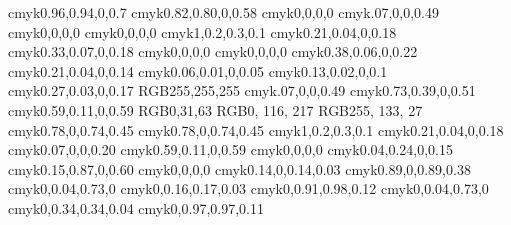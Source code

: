 \definecolor{firstpagetop@bg@color}		{cmyk}{0.96,0.94,0,0.7}
\definecolor{firstpagebottom@bg@color}	{cmyk}{0.82,0.80,0,0.58}
\definecolor{titledoc@color}				{cmyk}{0,0,0,0}
\definecolor{firstpage@lines@color}		{cmyk}{.07,0,0,0.49}
\definecolor{titleauthor@color}			{cmyk}{0,0,0,0}
\definecolor{titledate@color}			{cmyk}{0,0,0,0}
\definecolor{chapter@bg@color}			{cmyk}{1,0.2,0.3,0.1}
\definecolor{chapterdegrade@color}		{cmyk}{0.21,0.04,0,0.18}
\definecolor{chapterellipse@bg@color}	{cmyk}{0.33,0.07,0,0.18}
\definecolor{chapterellipse@color}		{cmyk}{0,0,0,0}
\definecolor{chaptertitlename@color}		{cmyk}{0,0,0,0}
\definecolor{chapterrule@color}			{cmyk}{0.38,0.06,0,0.22}
\definecolor{chaptermidcircle@color}		{cmyk}{0.21,0.04,0,0.14}
\definecolor{chapterbotcircle@color}		{cmyk}{0.06,0.01,0,0.05}
\definecolor{chaptertopcircle@color}		{cmyk}{0.13,0.02,0,0.1}
\definecolor{chapterline@color}			{cmyk}{0.27,0.03,0,0.17}
\definecolor{pagenumber@bg@color}		{RGB}{255,255,255}
\definecolor{shadow@color}				{cmyk}{.07,0,0,0.49}
\definecolor{chapterintro@color}			{cmyk}{0.73,0.39,0,0.51}
\definecolor{chapter@title@color}		{cmyk}{0.59,0.11,0,0.59}
\definecolor{section@title@color}		{RGB}{0,31,63}
\definecolor{subsection@title@color}		{RGB}{0, 116, 217}
\definecolor{subsubsection@title@color}	{RGB}{255, 133, 27}
\definecolor{paragraph@title@color}		{cmyk}{0.78,0,0.74,0.45}
\definecolor{subparagraph@title@color}	{cmyk}{0.78,0,0.74,0.45}
\definecolor{arrayrule@color}			{cmyk}{1,0.2,0.3,0.1}
\definecolor{cell@color}					{cmyk}{0.21,0.04,0,0.18}
\definecolor{rem@bg@color}				{cmyk}{0.07,0,0,0.20}
\definecolor{remtitle@bg@color}			{cmyk}{0.59,0.11,0,0.59}
\definecolor{remtitle@color}				{cmyk}{0,0,0,0}
\definecolor{meth@bg@color}				{cmyk}{0.04,0.24,0,0.15}
\definecolor{methtitle@bg@color}			{cmyk}{0.15,0.87,0,0.60}
\definecolor{methtitle@color}			{cmyk}{0,0,0,0}
\definecolor{def@bg@color}				{cmyk}{0.14,0,0.14,0.03}
\definecolor{deftitle@bg@color}			{cmyk}{0.89,0,0.89,0.38}
\definecolor{deftitle@color}				{cmyk}{0,0.04,0.73,0}
\definecolor{prop@bg@color}				{cmyk}{0,0.16,0.17,0.03}
\definecolor{proptitle@bg@color}			{cmyk}{0,0.91,0.98,0.12}
\definecolor{proptitle@color}			{cmyk}{0,0.04,0.73,0}
\definecolor{thm@bg@color}				{cmyk}{0,0.34,0.34,0.04}
\definecolor{thmtitle@bg@color}			{cmyk}{0,0.97,0.97,0.11}
